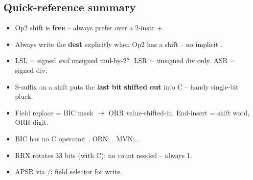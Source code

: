 \subsection{Quick-reference summary}
\begin{itemize}
\item Op2 shift is \textbf{free} -- always prefer  over a 2-instr +.
\item Always write the \textbf{dest} explicitly when Op2 has a shift -- no implicit .
\item LSL = signed \emph{and} unsigned mul-by-$2^n$. LSR = unsigned div only. ASR = signed div.
\item S-suffix on a shift puts the \textbf{last bit shifted out} into C -- handy single-bit pluck.
\item Field replace = BIC mask $\to$ ORR value-shifted-in. End-insert = shift word, ORR digit.
\item BIC has no C operator: . ORN: . MVN: .
\item RRX rotates 33 bits (with C); no count needed -- always 1.
\item APSR via /;  field selector for write.
\end{itemize}
